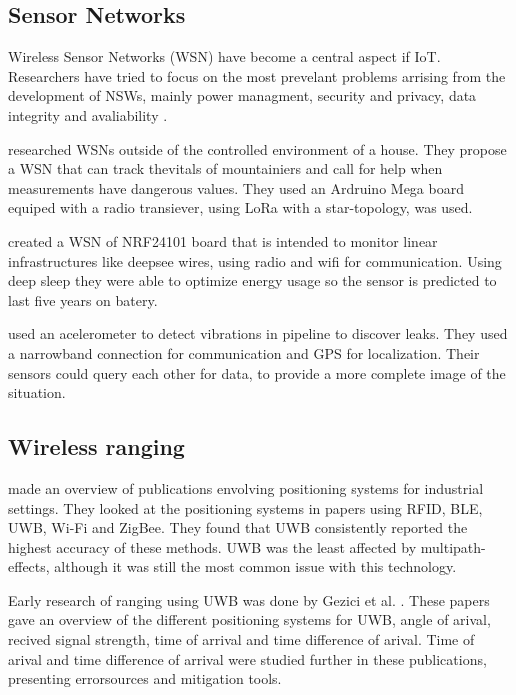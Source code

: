 \subsection{Sensor Networks}

Wireless Sensor Networks (WSN) have become a central aspect if IoT.
Researchers have tried to focus on the most prevelant problems arrising from the development of NSWs, mainly power managment, security and privacy, data integrity and avaliability \cite{gulati2022review}.


\cite{garg2021healthcare} researched WSNs outside of the controlled environment of a house. They propose a WSN that can track thevitals of mountainiers and call for help when measurements have dangerous values. 
They used an Ardruino Mega board equiped with a radio transiever, using LoRa with a star-topology, was used.


\cite{jones2021wireless} created a WSN of NRF24101 board that is intended to monitor linear infrastructures like deepsee wires, using radio and wifi for communication. Using deep sleep they were able to optimize energy usage so the sensor is predicted to last five years on batery.


\cite{spandonidis2022evaluation} used an acelerometer to detect vibrations in pipeline to discover leaks. 
They used a narrowband connection for communication and GPS for localization.
Their sensors could query each other for data, to provide a more complete image of the situation.


\subsection{Wireless ranging}

\cite{li2024indoor} made an overview of publications envolving positioning systems for industrial settings. 
They looked at the positioning systems in papers using RFID, BLE, UWB, Wi-Fi and ZigBee. They found that UWB consistently reported the highest accuracy of these methods.
UWB was the least affected by multipath-effects, although it was still the most common issue with this technology.


Early research of ranging using UWB was done by Gezici et al. \cite{gezici2008survey, gezici2005localization}.
These papers gave an overview of the different positioning systems for UWB, angle of arival, recived signal strength, time of arrival and time difference of arival.
Time of arival and time difference of arrival were studied further in these publications, presenting errorsources and mitigation tools.


